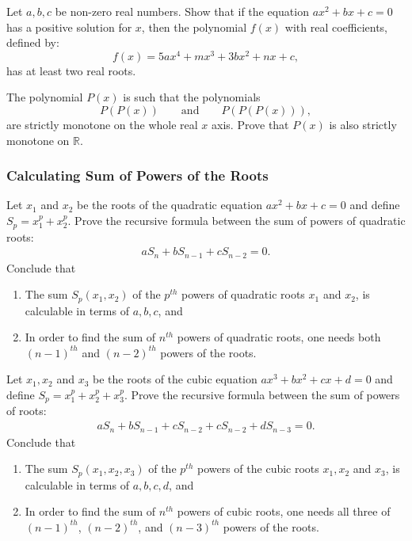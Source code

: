 \documentclass[12pt,a4paper]{memoir}
\theoremstyle{definition}
\begin{document}
\begin{question}
	Let $a,b,c$ be non-zero real numbers. Show that if the equation $ax^{2}+bx+c=0$ has a positive solution for $x$, then the polynomial $f(x)$ with real coefficients, defined by: 
	\[f(x)=5ax^{4}+mx^{3}+3bx^{2}+nx+c,\] 
	has at least two real roots.
\end{question}

\begin{question}
	The polynomial $P(x)$ is such that the polynomials \[P(P(x)) \qquad \text{and} \qquad P(P(P(x))),\] are strictly monotone on the whole real $x$ axis. Prove that $P(x)$ is also strictly monotone on $\mathbb R$.
\end{question}


\subsubsection{Calculating Sum of Powers of the Roots}


	\begin{question}[name={Sum of Powers of Quadratic Roots}]\label{p:sum-of-powers-quadratic}
		Let $x_1$ and $x_2$ be the roots of the quadratic equation $ax^2+bx+c=0$ and define $S_p=x_1^p+x_2^p$. Prove the recursive formula between the sum of powers of quadratic roots:
		\begin{align*}
			aS_n + bS_{n-1} + cS_{n-2} = 0.
		\end{align*}
		Conclude that
		\begin{enumerate}
			\item The sum $S_p(x_1,x_2)$ of the $p^{th}$ powers of quadratic roots $x_1$ and $x_2$, is calculable in terms of $a,b,c$, and
			\item In order to find the sum of $n^{th}$ powers of quadratic roots, one needs both $(n-1)^{th}$ and $(n-2)^{th}$ powers of the roots.
		\end{enumerate}
	\end{question}
	
	\begin{question}[name={Sum of Powers of Cubic Roots}]\label{p:sum-of-powers-cubic}
		Let $x_1,x_2$ and $x_3$ be the roots of the cubic equation $ax^3+bx^2+cx+d=0$ and define $S_p=x_1^p+x_2^p+x_3^p$. Prove the recursive formula between the sum of powers of roots:
		\begin{align*}
			aS_n + bS_{n-1} + cS_{n-2} + cS_{n-2} + dS_{n-3} = 0.
		\end{align*}
		Conclude that
		\begin{enumerate}
			\item The sum $S_p(x_1,x_2,x_3)$ of the $p^{th}$ powers of the cubic roots $x_1,x_2$ and $x_3$, is calculable in terms of $a,b,c, d$, and
			\item In order to find the sum of $n^{th}$ powers of cubic roots, one needs all three of $(n-1)^{th}$, $(n-2)^{th}$, and $(n-3)^{th}$ powers of the roots.
		\end{enumerate}
	\end{question}
\end{document}
